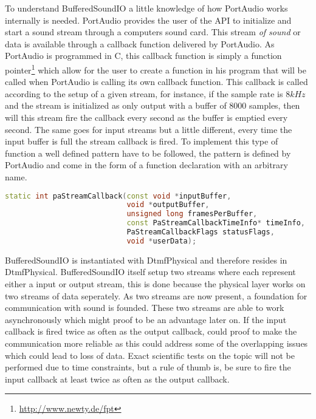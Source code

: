 	To understand BufferedSoundIO a little knowledge of how PortAudio works internally is needed. PortAudio provides the user of the API to initialize
	and start a sound stream through a computers sound card. This stream \textit{of sound} or data is available through a callback function delivered
	by PortAudio. As PortAudio is programmed in C, this callback function is simply a function pointer\footnote{\url{http://www.newty.de/fpt}}
	which allow for the user to create a function in his program that will be called when PortAudio is calling its own callback function.
	This callback is called according to the setup of a given stream, for instance, if the sample rate is $8kHz$ and the stream is initialized as 
	only output with a buffer of 8000 samples, then will this stream fire the callback every second as the buffer is emptied every second.
	The same goes for input streams but a little different, every time the input buffer is full the stream callback is fired. To implement
	this type of function a well defined pattern have to be followed, the pattern is defined by PortAudio and come in the form of a
	function declaration with an arbitrary name. 
	
	\begin{lstlisting}[float=htb,language={C++},caption={PortAudios callback function declaration. This declaration is used for both input
	streams, output streams, and the two in combination},label={lst:pa_callback}]
static int paStreamCallback(const void *inputBuffer,
							void *outputBuffer,
							unsigned long framesPerBuffer,
							const PaStreamCallbackTimeInfo* timeInfo,
							PaStreamCallbackFlags statusFlags,
							void *userData);
	\end{lstlisting}
	
	BufferedSoundIO is instantiated with DtmfPhysical and therefore resides in DtmfPhysical. BufferedSoundIO itself setup two streams where each
	represent either a input or output stream, this is done because the physical layer works on two streams of data seperately. As two streams are 
	now present, a foundation for communication with sound is founded. These two streams are able to work asynchronously which might proof to be an
	advantage later on. If the input callback is fired twice as often as the output callback, could proof to make the communication more reliable
	as this could address some of the overlapping issues which could lead to loss of data. Exact scientific tests on the topic will not be performed
	due to time constraints, but a rule of thumb is, be sure to fire the input callback at least twice as often as the output callback.
	

